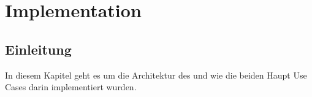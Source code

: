 \chapter{Implementation}
\label{chap:Implementation}

\section{Einleitung}
In diesem Kapitel geht es um die Architektur des \tool und wie die beiden Haupt Use Cases darin implementiert wurden.


\clearpage

 